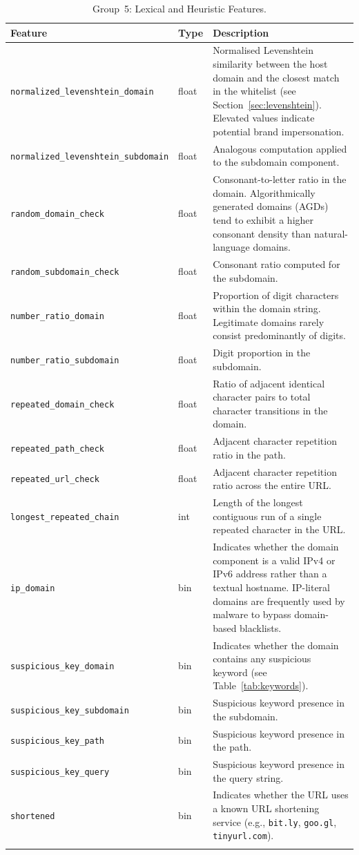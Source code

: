 \documentclass[a4paper,12pt]{article}
\begin{document}
\begin{longtable}{p{5.8cm}p{1.2cm}p{6cm}}
\toprule
\textbf{Feature} & \textbf{Type} & \textbf{Description} \\
\midrule
\endhead
\texttt{normalized\_levenshtein\_domain} & float &
    Normalised Levenshtein similarity between the host domain and the closest match in the whitelist (see Section~\ref{sec:levenshtein}). Elevated values indicate potential brand impersonation. \\
\texttt{normalized\_levenshtein\_subdomain} & float &
    Analogous computation applied to the subdomain component. \\
\texttt{random\_domain\_check} & float &
    Consonant-to-letter ratio in the domain. Algorithmically generated domains (AGDs) tend to exhibit a higher consonant density than natural-language domains. \\
\texttt{random\_subdomain\_check} & float &
    Consonant ratio computed for the subdomain. \\
\texttt{number\_ratio\_domain} & float &
    Proportion of digit characters within the domain string. Legitimate domains rarely consist predominantly of digits. \\
\texttt{number\_ratio\_subdomain} & float &
    Digit proportion in the subdomain. \\
\texttt{repeated\_domain\_check} & float &
    Ratio of adjacent identical character pairs to total character transitions in the domain. \\
\texttt{repeated\_path\_check} & float &
    Adjacent character repetition ratio in the path. \\
\texttt{repeated\_url\_check} & float &
    Adjacent character repetition ratio across the entire URL. \\
\texttt{longest\_repeated\_chain} & int &
    Length of the longest contiguous run of a single repeated character in the URL. \\
\texttt{ip\_domain} & bin &
    Indicates whether the domain component is a valid IPv4 or IPv6 address rather than a textual hostname. IP-literal domains are frequently used by malware to bypass domain-based blacklists. \\
\texttt{suspicious\_key\_domain} & bin &
    Indicates whether the domain contains any suspicious keyword (see Table~\ref{tab:keywords}). \\
\texttt{suspicious\_key\_subdomain} & bin &
    Suspicious keyword presence in the subdomain. \\
\texttt{suspicious\_key\_path} & bin &
    Suspicious keyword presence in the path. \\
\texttt{suspicious\_key\_query} & bin &
    Suspicious keyword presence in the query string. \\
\texttt{shortened} & bin &
    Indicates whether the URL uses a known URL shortening service (e.g., \texttt{bit.ly}, \texttt{goo.gl}, \texttt{tinyurl.com}). \\
\bottomrule
\caption{Group~5: Lexical and Heuristic Features.}
\label{tab:lexical}
\end{longtable}
\end{document}
